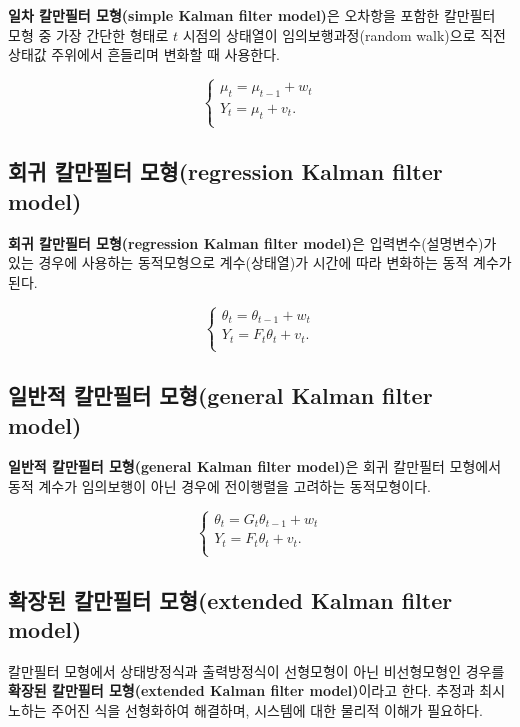\documentclass[b5paper,]{scrbook}
\theoremstyle{plain}
\theoremstyle{definition}
\numberwithin{equation}{section}
\begin{document}
\textbf{일차 칼만필터 모형(simple Kalman filter model)}은 오차항을
포함한 칼만필터 모형 중 가장 간단한 형태로 \(t\) 시점의 상태열이
임의보행과정(random walk)으로 직전 상태값 주위에서 흔들리며 변화할 때
사용한다.

\[
\begin{cases}
\mu_{t}=\mu_{t-1}+w_{t} \\
Y_{t}=\mu_{t}+v_{t}.\\
\end{cases}
\]

\subsection{회귀 칼만필터 모형(regression Kalman filter
model)}\label{--regression-kalman-filter-model}

\textbf{회귀 칼만필터 모형(regression Kalman filter model)}은
입력변수(설명변수)가 있는 경우에 사용하는 동적모형으로 계수(상태열)가
시간에 따라 변화하는 동적 계수가 된다.

\[
\begin{cases}
\theta_{t}=\theta_{t-1}+w_{t} \\
Y_{t}=F_{t}\theta_{t}+v_{t}.\\
\end{cases}
\]

\subsection{일반적 칼만필터 모형(general Kalman filter
model)}\label{--general-kalman-filter-model}

\textbf{일반적 칼만필터 모형(general Kalman filter model)}은 회귀
칼만필터 모형에서 동적 계수가 임의보행이 아닌 경우에 전이행렬을 고려하는
동적모형이다.

\[
\begin{cases}
\theta_{t}=G_{t}\theta_{t-1}+w_{t} \\
Y_{t}=F_{t}\theta_{t}+v_{t}.\\
\end{cases}
\]

\subsection{확장된 칼만필터 모형(extended Kalman filter
model)}\label{--extended-kalman-filter-model}

칼만필터 모형에서 상태방정식과 출력방정식이 선형모형이 아닌 비선형모형인
경우를 \textbf{확장된 칼만필터 모형(extended Kalman filter model)}이라고
한다. 추정과 최시노하는 주어진 식을 선형화하여 해결하며, 시스템에 대한
물리적 이해가 필요하다.
\end{document}
